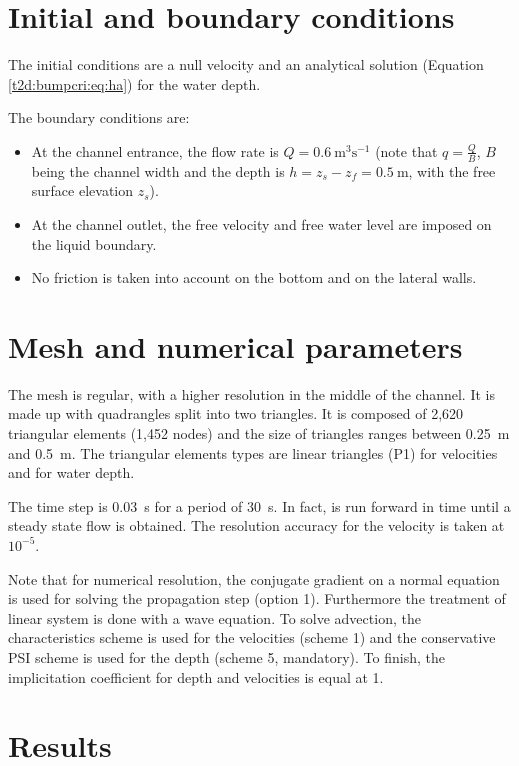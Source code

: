 \section{Initial and boundary conditions}
\bigskip
The initial conditions are a null velocity and an analytical solution 
(Equation \eqref{t2d:bumpcri:eq:ha}) for the water depth.

\bigskip
The boundary conditions are:
\begin{itemize}
\item At the channel entrance, the flow rate is $Q = 0.6~\text{m}^3\text{s}^{-1}$ 
(note that  $\displaystyle{q=\frac{Q}{B}}$, $B$ being the channel 
width and the depth is  $\displaystyle{h = z_{s}-z_{f} = 0.5~\text{m}}$, 
with the free surface elevation $z_{s}$).
\item At the channel outlet, the free velocity and free water level are 
imposed on the liquid boundary.
\item No friction is taken into account on the bottom and on the lateral walls.
\end{itemize}

\section{Mesh and numerical parameters}
\bigskip
The mesh is regular, with a higher resolution in the middle of the channel. 
It is made up with quadrangles split into two triangles.
It is composed of 2,620 triangular elements (1,452 nodes) and the size 
of triangles ranges between 0.25~m and 0.5~m. The triangular elements types 
are linear triangles (P1) for velocities and for water depth.

\bigskip
The time step is 0.03~s for a period of 30~s. In fact,  is 
run forward in time until a steady state flow is obtained. The resolution 
accuracy for the velocity is taken at $10^{-5}$.

\bigskip
Note that for numerical resolution, the conjugate gradient on a normal 
equation is used for solving the propagation step (option 1).
Furthermore the treatment of linear system is done with a wave equation. 
To solve advection, the characteristics scheme is used for the velocities 
(scheme 1) and the conservative PSI scheme is used for the depth (scheme 5, mandatory). 
To finish, the implicitation coefficient for depth and velocities is equal at 1.

\section{Results}

